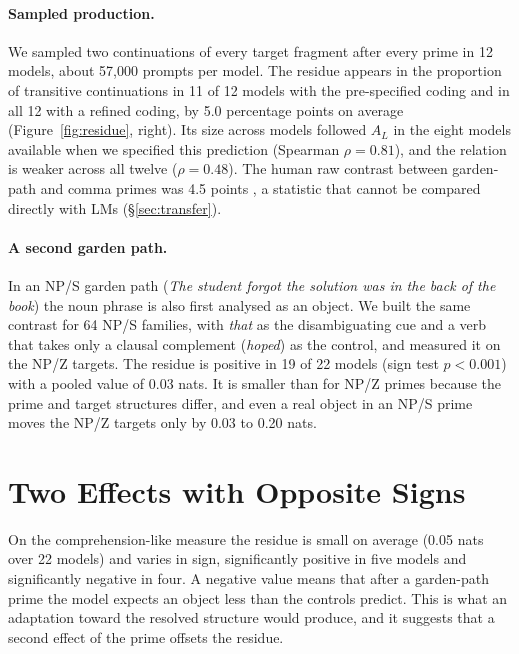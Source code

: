 \documentclass[11pt]{article}
\newcommand{\ex}[1]{\textit{#1}}
\begin{document}
\paragraph{Sampled production.}
We sampled two continuations of every target fragment after every prime in 12 models, about 57,000 prompts per model.
The residue appears in the proportion of transitive continuations in 11 of 12 models with the pre-specified coding and in all 12 with a refined coding, by 5.0 percentage points on average (Figure~\ref{fig:residue}, right).
Its size across models followed $A_L$ in the eight models available when we specified this prediction (Spearman $\rho=0.81$), and the relation is weaker across all twelve ($\rho=0.48$).
The human raw contrast between garden-path and comma primes was 4.5 points \citep{vangompel2006}, a statistic that cannot be compared directly with LMs (\S\ref{sec:transfer}).

\paragraph{A second garden path.}
In an NP/S garden path (\ex{The student forgot the solution was in the back of the book}) the noun phrase is also first analysed as an object.
We built the same contrast for 64 NP/S families, with \ex{that} as the disambiguating cue and a verb that takes only a clausal complement (\ex{hoped}) as the control, and measured it on the NP/Z targets.
The residue is positive in 19 of 22 models (sign test $p<0.001$) with a pooled value of 0.03 nats.
It is smaller than for NP/Z primes because the prime and target structures differ, and even a real object in an NP/S prime moves the NP/Z targets only by 0.03 to 0.20 nats.

\section{Two Effects with Opposite Signs}
\label{sec:twoforces}


On the comprehension-like measure the residue is small on average (0.05 nats over 22 models) and varies in sign, significantly positive in five models and significantly negative in four.
A negative value means that after a garden-path prime the model expects an object less than the controls predict.
This is what an adaptation toward the resolved structure would produce, and it suggests that a second effect of the prime offsets the residue.
\end{document}
